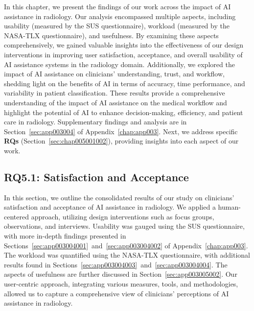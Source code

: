 In this chapter, we present the findings of our work across the impact of \ac{AI} assistance in radiology.
Our analysis encompassed multiple aspects, including usability (measured by the \ac{SUS} questionnaire), workload (measured by the \ac{NASA-TLX} questionnaire), and usefulness.
By examining these aspects comprehensively, we gained valuable insights into the effectiveness of our design interventions in improving user satisfaction, acceptance, and overall usability of \ac{AI} assistance systems in the radiology domain.
Additionally, we explored the impact of \ac{AI} assistance on clinicians' understanding, trust, and workflow, shedding light on the benefits of \ac{AI} in terms of accuracy, time performance, and variability in patient classification.
These results provide a comprehensive understanding of the impact of \ac{AI} assistance on the medical workflow and highlight the potential of \ac{AI} to enhance decision-making, efficiency, and patient care in radiology.
Supplementary findings and analysis are in Section~\ref{sec:app003004} of Appendix~\ref{chap:app003}.
Next, we address specific {\bf \acsp{RQ}} (Section~\ref{sec:chap005001002}), providing insights into each aspect of our work.

\subsection{RQ5.1: Satisfaction and Acceptance}
\label{sec:chap005006001}

In this section, we outline the consolidated results of our study on clinicians' satisfaction and acceptance of \ac{AI} assistance in radiology.
We applied a human-centered approach, utilizing design interventions such as focus groups, observations, and interviews.
Usability was gauged using the \ac{SUS} questionnaire, with more in-depth findings presented in Sections~\ref{sec:app003004001}~and~\ref{sec:app003004002} of Appendix~\ref{chap:app003}.
The workload was quantified using the \ac{NASA-TLX} questionnaire, with additional results found in Sections~\ref{sec:app003004003}~and~\ref{sec:app003004004}.
The aspects of usefulness are further discussed in Section~\ref{sec:app003005002}.
Our user-centric approach, integrating various measures, tools, and methodologies, allowed us to capture a comprehensive view of clinicians' perceptions of \ac{AI} assistance in radiology.

